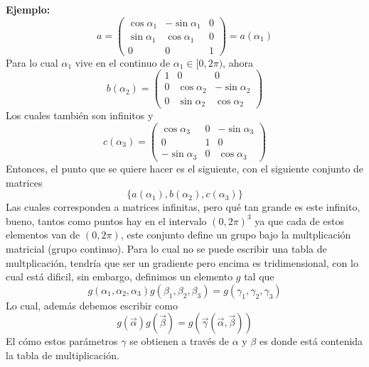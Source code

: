 \documentclass[../main.tex]{subfiles}
\begin{document}
\textbf{Ejemplo:}
\begin{equation*}
  a = 
  \begin{pmatrix}
    \cos{\alpha_1} & -\sin{\alpha_1} & 0 \\
    \sin{\alpha_1} & \cos{\alpha_1} & 0 \\
    0 & 0 & 1
  \end{pmatrix}
  = a(\alpha_1)
\end{equation*}
Para lo cual $\alpha_1$ vive en el continuo de $\alpha_1\in[0,2\pi)$, ahora
\begin{equation*}
  b(\alpha_2) =
  \begin{pmatrix}
    1 & 0 & 0 \\
    0 & \cos{\alpha_2} & -\sin{\alpha_2} \\
    0 & \sin{\alpha_2} & \cos{\alpha_2}
  \end{pmatrix}
\end{equation*}
Los cuales también son infinitos y 
\begin{equation*}
  c(\alpha_3) =
  \begin{pmatrix}
    \cos{\alpha_3} & 0 & -\sin{\alpha_3} \\
    0 & 1 & 0 \\
    -\sin{\alpha_3} & 0 & \cos{\alpha_3} 
  \end{pmatrix}
\end{equation*}
Entonces, el punto que se quiere hacer es el siguiente, con el siguiente conjunto de matrices
\begin{equation*}
   \{a(\alpha_1),b(\alpha_2), c(\alpha_3)\}
\end{equation*}
Las cuales corresponden a matrices infinitas, pero qué tan grande es este infinito, bueno, tantos como puntos hay en el intervalo $(0,2\pi)^3$ ya que cada de estos elementos van de $(0,2\pi)$, este conjunto define un grupo bajo la multplicación matricial (grupo continuo). Para lo cual no se puede escribir una tabla de multplicación, tendría que ser un gradiente pero encima es tridimensional, con lo cual está dificil, sin embargo, definimos un elemento $g$ tal que
\begin{equation*}
  g(\alpha_1,\alpha_2,\alpha_3) g(\beta_1,\beta_2,\beta_3) = g(\gamma_1,\gamma_2,\gamma_3)
\end{equation*}
Lo cual, además debemos escribir como
\begin{equation*}
  g(\vec{\alpha})g(\vec{\beta}) = g(\vec{\gamma}(\vec{\alpha},\vec{\beta}))
\end{equation*}
El cómo estos parámetros $\gamma$ se obtienen a través de $\alpha$ y $\beta$ es donde está contenida la tabla de multiplicación.
\end{document}
